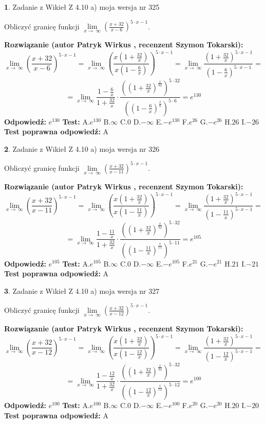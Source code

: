 \documentclass[12pt, a4paper]{article}
\theoremstyle{definition} %
\newtheorem{zad}{}
\newcommand{\zadStart}[1]{\begin{zad}#1\newline}
\newcommand{\zadStop}{\end{zad}}
\newcommand{\rozwStart}[2]{\noindent \textbf{Rozwiązanie (autor #1 , recenzent #2): }\newline}
\newcommand{\rozwStop}{\newline}
\newcommand{\odpStart}{\noindent \textbf{Odpowiedź:}\newline}
\newcommand{\odpStop}{\newline}
\newcommand{\testStart}{\noindent \textbf{Test:}\newline}
\newcommand{\testStop}{\newline}
\newcommand{\kluczStart}{\noindent \textbf{Test poprawna odpowiedź:}\newline}
\newcommand{\kluczStop}{\newline}
\begin{document}
\zadStart{Zadanie z Wikieł Z 4.10 a) moja wersja nr 325}

Obliczyć granicę funkcji  $\lim\limits_{x\to\ \infty}(\frac{x+32}{x-6})^{5\cdot x-1}$.
\zadStop
\rozwStart{Patryk Wirkus}{Szymon Tokarski}
$$\lim\limits_{x\to\ \infty}(\frac{x+32}{x-6})^{5\cdot x-1} = \lim\limits_{x\to\ \infty}(\frac{x(1+\frac{32}{x})}{x(1-\frac{6}{x})})^{5\cdot x-1}=\lim\limits_{x\to\ \infty}\frac{(1+\frac{32}{x})^{5\cdot x-1}}{(1-\frac{6}{x})^{5\cdot x-1}}=$$
$$=\lim\limits_{x\to\ \infty}\frac{1-\frac{6}{x}}{1+\frac{32}{x}}\cdot\frac{((1+\frac{32}{x})^{\frac{x}{32}})^{5\cdot32}}{((1-\frac{6}{x})^{\frac{x}{6}})^{5\cdot6}}=e^{130}$$
\rozwStop
\odpStart
$e^{130}$
\odpStop
\testStart
A.$e^{130}$ B.$\infty$ C.$0$ D.$-\infty$ E.$-e^{130}$
F.$e^{26}$ G.$-e^{26}$
H.$26$
I.$-26$
\testStop
\kluczStart
A
\kluczStop



\zadStart{Zadanie z Wikieł Z 4.10 a) moja wersja nr 326}

Obliczyć granicę funkcji  $\lim\limits_{x\to\ \infty}(\frac{x+32}{x-11})^{5\cdot x-1}$.
\zadStop
\rozwStart{Patryk Wirkus}{Szymon Tokarski}
$$\lim\limits_{x\to\ \infty}(\frac{x+32}{x-11})^{5\cdot x-1} = \lim\limits_{x\to\ \infty}(\frac{x(1+\frac{32}{x})}{x(1-\frac{11}{x})})^{5\cdot x-1}=\lim\limits_{x\to\ \infty}\frac{(1+\frac{32}{x})^{5\cdot x-1}}{(1-\frac{11}{x})^{5\cdot x-1}}=$$
$$=\lim\limits_{x\to\ \infty}\frac{1-\frac{11}{x}}{1+\frac{32}{x}}\cdot\frac{((1+\frac{32}{x})^{\frac{x}{32}})^{5\cdot32}}{((1-\frac{11}{x})^{\frac{x}{11}})^{5\cdot11}}=e^{105}$$
\rozwStop
\odpStart
$e^{105}$
\odpStop
\testStart
A.$e^{105}$ B.$\infty$ C.$0$ D.$-\infty$ E.$-e^{105}$
F.$e^{21}$ G.$-e^{21}$
H.$21$
I.$-21$
\testStop
\kluczStart
A
\kluczStop



\zadStart{Zadanie z Wikieł Z 4.10 a) moja wersja nr 327}

Obliczyć granicę funkcji  $\lim\limits_{x\to\ \infty}(\frac{x+32}{x-12})^{5\cdot x-1}$.
\zadStop
\rozwStart{Patryk Wirkus}{Szymon Tokarski}
$$\lim\limits_{x\to\ \infty}(\frac{x+32}{x-12})^{5\cdot x-1} = \lim\limits_{x\to\ \infty}(\frac{x(1+\frac{32}{x})}{x(1-\frac{12}{x})})^{5\cdot x-1}=\lim\limits_{x\to\ \infty}\frac{(1+\frac{32}{x})^{5\cdot x-1}}{(1-\frac{12}{x})^{5\cdot x-1}}=$$
$$=\lim\limits_{x\to\ \infty}\frac{1-\frac{12}{x}}{1+\frac{32}{x}}\cdot\frac{((1+\frac{32}{x})^{\frac{x}{32}})^{5\cdot32}}{((1-\frac{12}{x})^{\frac{x}{12}})^{5\cdot12}}=e^{100}$$
\rozwStop
\odpStart
$e^{100}$
\odpStop
\testStart
A.$e^{100}$ B.$\infty$ C.$0$ D.$-\infty$ E.$-e^{100}$
F.$e^{20}$ G.$-e^{20}$
H.$20$
I.$-20$
\testStop
\kluczStart
A
\kluczStop
\end{document}
